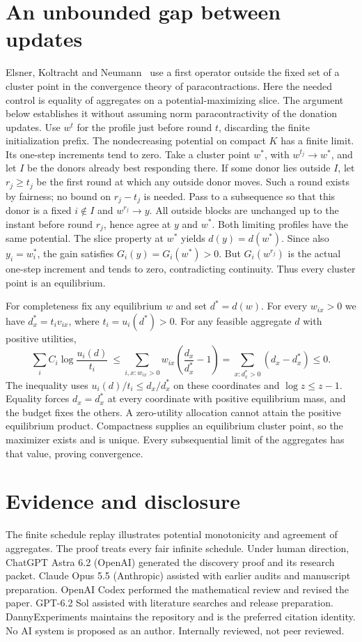 \documentclass[11pt,a4paper]{amsart}
\begin{document}
\section{An unbounded gap between updates}
Elsner, Koltracht and Neumann~\cite[proof of Theorem~1]{ekn} use a first operator outside the fixed set of a cluster point in the convergence theory of paracontractions. Here the needed control is equality of aggregates on a potential-maximizing slice. The argument below establishes it without assuming norm paracontractivity of the donation updates.
Use $w^t$ for the profile just before round $t$, discarding the finite initialization prefix. The nondecreasing potential on compact $K$ has a finite limit. Its one-step increments tend to zero. Take a cluster point $w^*$, with $w^{t_j}\to w^*$, and let $I$ be the donors already best responding there. If some donor lies outside $I$, let $r_j\ge t_j$ be the first round at which any outside donor moves. Such a round exists by fairness; no bound on $r_j-t_j$ is needed. Pass to a subsequence so that this donor is a fixed $i\notin I$ and $w^{r_j}\to y$. All outside blocks are unchanged up to the instant before round $r_j$, hence agree at $y$ and $w^*$. Both limiting profiles have the same potential. The slice property at $w^*$ yields $d(y)=d(w^*)$. Since also $y_i=w_i^*$, the gain satisfies $G_i(y)=G_i(w^*)>0$. But $G_i(w^{r_j})$ is the actual one-step increment and tends to zero, contradicting continuity. Thus every cluster point is an equilibrium.

For completeness fix any equilibrium $w$ and set $d^*=d(w)$. For every $w_{ix}>0$ we have $d_x^*=t_i v_{ix}$, where $t_i=u_i(d^*)>0$. For any feasible aggregate $d$ with positive utilities,
\[
 \sum_i C_i\log\frac{u_i(d)}{t_i}
 \ \le\sum_{i,x:w_{ix}>0}w_{ix}\left(\frac{d_x}{d_x^*}-1\right)
 =\sum_{x:d_x^*>0}(d_x-d_x^*)\le0 .
\]
The inequality uses $u_i(d)/t_i\le d_x/d_x^*$ on these coordinates and $\log z\le z-1$. Equality forces $d_x=d_x^*$ at every coordinate with positive equilibrium mass, and the budget fixes the others. A zero-utility allocation cannot attain the positive equilibrium product. Compactness supplies an equilibrium cluster point, so the maximizer exists and is unique. Every subsequential limit of the aggregates has that value, proving convergence.

\section*{Evidence and disclosure}
The finite schedule replay illustrates potential monotonicity and agreement of aggregates. The proof treats every fair infinite schedule. Under human direction, ChatGPT Astra 6.2 (OpenAI) generated the discovery proof and its research packet. Claude Opus 5.5 (Anthropic) assisted with earlier audits and manuscript preparation. OpenAI Codex performed the mathematical review and revised the paper. GPT-6.2 Sol assisted with literature searches and release preparation. DannyExperiments maintains the repository and is the preferred citation identity. No AI system is proposed as an author. Internally reviewed, not peer reviewed.


\end{document}
